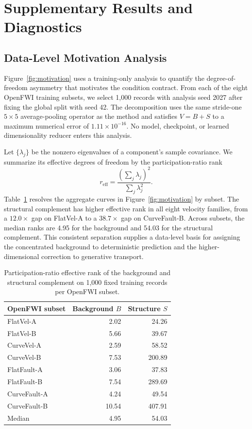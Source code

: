 \section{Supplementary Results and Diagnostics}
\label{app:supplementary-results}

\subsection{Data-Level Motivation Analysis}
Figure~\ref{fig:motivation} uses a training-only analysis to quantify the degree-of-freedom asymmetry that motivates the condition contract. From each of the eight OpenFWI training subsets, we select 1,000 records with analysis seed 2027 after fixing the global split with seed 42. The decomposition uses the same stride-one $5\times5$ average-pooling operator as the method and satisfies $V=B+S$ to a maximum numerical error of $1.11\times10^{-16}$. No model, checkpoint, or learned dimensionality reducer enters this analysis.

Let $\{\lambda_j\}$ be the nonzero eigenvalues of a component's sample covariance. We summarize its effective degrees of freedom by the participation-ratio rank
\begin{equation}
r_{\mathrm{eff}}=\frac{\left(\sum_j\lambda_j\right)^2}{\sum_j\lambda_j^2}.
\label{eq:effective-rank}
\end{equation}
Table~\ref{tab:effective-rank} resolves the aggregate curves in Figure~\ref{fig:motivation} by subset. The structural complement has higher effective rank in all eight velocity families, from a $12.0\times$ gap on FlatVel-A to a $38.7\times$ gap on CurveFault-B. Across subsets, the median ranks are 4.95 for the background and 54.03 for the structural complement. This consistent separation supplies a data-level basis for assigning the concentrated background to deterministic prediction and the higher-dimensional correction to generative transport.

\begin{table}[H]
\centering
\small
\begin{tabular}{@{}lrr@{}}
\toprule
OpenFWI subset & Background $B$ & Structure $S$ \\
\midrule
FlatVel-A & 2.02 & 24.26 \\
FlatVel-B & 5.66 & 39.67 \\
CurveVel-A & 2.59 & 58.52 \\
CurveVel-B & 7.53 & 200.89 \\
FlatFault-A & 3.06 & 37.83 \\
FlatFault-B & 7.54 & 289.69 \\
CurveFault-A & 4.24 & 49.54 \\
CurveFault-B & 10.54 & 407.91 \\
\midrule
Median & 4.95 & 54.03 \\
\bottomrule
\end{tabular}
\caption{Participation-ratio effective rank of the background and structural complement on 1,000 fixed training records per OpenFWI subset.}
\label{tab:effective-rank}
\end{table}

